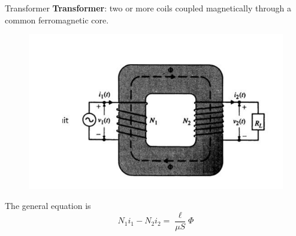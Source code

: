\documentclass[xcolor={dvipsnames}]{beamer}
\begin{document}
\begin{frame}{Transformer}
\textbf{Transformer}: two or more coils coupled magnetically through a common ferromagnetic core.
\begin{figure}[H]
	\centering
	\includegraphics[width=0.7\linewidth]{8_1.png}
\end{figure}
The general equation is
$$N_{1} i_{1}-N_{2} i_{2}=\frac{\ell}{\mu S} \Phi$$
\end{frame}
\end{document}
